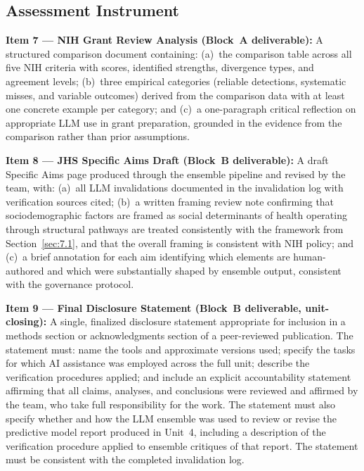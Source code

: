 \subsection{Assessment Instrument}

\textbf{Item 7 --- NIH Grant Review Analysis (Block~A
deliverable):}
A structured comparison document containing: (a)~the comparison
table across all five NIH criteria with scores, identified
strengths, divergence types, and agreement levels; (b)~three
empirical categories (reliable detections, systematic misses,
and variable outcomes) derived from the comparison data with
at least one concrete example per category; and (c)~a one-paragraph
critical reflection on appropriate LLM use in grant preparation,
grounded in the evidence from the comparison rather than prior
assumptions.

\textbf{Item 8 --- JHS Specific Aims Draft (Block~B deliverable):}
A draft Specific Aims page produced through the ensemble pipeline
and revised by the team, with: (a)~all LLM invalidations
documented in the invalidation log with verification sources
cited; (b)~a written  framing review note
confirming that sociodemographic
factors are framed as social determinants of health operating
through structural pathways are treated consistently with the framework from
Section~\ref{sec:7.1}, and that the overall framing is
consistent with NIH policy; and (c)~a brief
annotation for each aim identifying which elements are
human-authored and which were substantially shaped by ensemble
output, consistent with the governance protocol.

\textbf{Item 9 --- Final Disclosure Statement (Block~B
deliverable, unit-closing):}
A single, finalized disclosure statement appropriate for inclusion
in a methods section or acknowledgments section of a
peer-reviewed publication. The statement must: name the tools and
approximate versions used; specify the tasks for which AI
assistance was employed across the full unit; describe the
verification procedures applied; and include an explicit
accountability statement affirming that all claims, analyses,
and conclusions were reviewed and affirmed by the team, who
take full responsibility for the work. The statement must also
specify whether and how the LLM ensemble was used to review or
revise the predictive model report produced in Unit~4, including
a description of the verification procedure applied to ensemble
critiques of that report. The statement must be consistent with
the completed invalidation log.


